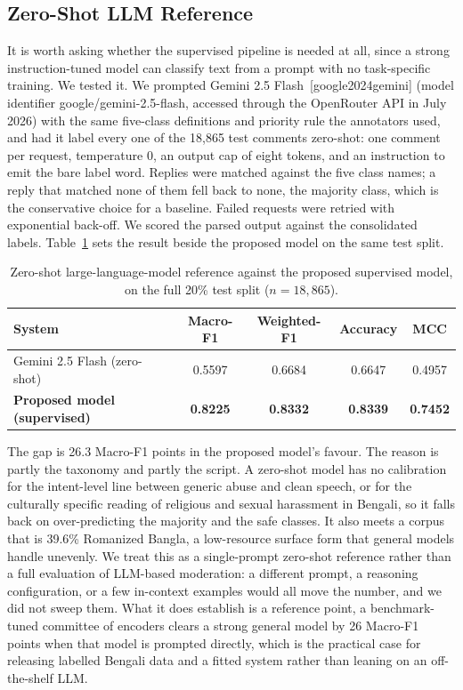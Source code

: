 \documentclass[11pt,a4paper]{article}
\def\citep#1{[#1]}%
\def\texttt#1{#1}%
\def\emph#1{#1}%
\begin{document}
\subsection{Zero-Shot LLM Reference}
\label{sec:llm-baseline}

It is worth asking whether the supervised pipeline is needed at all, since a strong instruction-tuned model can classify text from a prompt with no task-specific training. We tested it. We prompted Gemini 2.5 Flash~\citep{google2024gemini} (model identifier \texttt{google/gemini-2.5-flash}, accessed through the OpenRouter API in July 2026) with the same five-class definitions and priority rule the annotators used, and had it label every one of the 18{,}865 test comments zero-shot: one comment per request, temperature $0$, an output cap of eight tokens, and an instruction to emit the bare label word. Replies were matched against the five class names; a reply that matched none of them fell back to \emph{none}, the majority class, which is the conservative choice for a baseline. Failed requests were retried with exponential back-off. We scored the parsed output against the consolidated labels. Table~\ref{tab:llm} sets the result beside the proposed model on the same test split.

\begin{table}[!htbp]
\centering
\caption{Zero-shot large-language-model reference against the proposed supervised model, on the full 20\% test split ($n = 18{,}865$).}
\label{tab:llm}
\small
\begin{tabular}{@{}lcccc@{}}
\toprule
\textbf{System} & \textbf{Macro-F1} & \textbf{Weighted-F1} & \textbf{Accuracy} & \textbf{MCC} \\
\midrule
Gemini 2.5 Flash (zero-shot) & 0.5597 & 0.6684 & 0.6647 & 0.4957 \\
\textbf{Proposed model (supervised)} & \textbf{0.8225} & \textbf{0.8332} & \textbf{0.8339} & \textbf{0.7452} \\
\bottomrule
\end{tabular}
\end{table}

The gap is 26.3 Macro-F1 points in the proposed model's favour. The reason is partly the taxonomy and partly the script. A zero-shot model has no calibration for the intent-level line between generic abuse and clean speech, or for the culturally specific reading of religious and sexual harassment in Bengali, so it falls back on over-predicting the majority and the safe classes. It also meets a corpus that is 39.6\% Romanized Bangla, a low-resource surface form that general models handle unevenly. We treat this as a single-prompt zero-shot reference rather than a full evaluation of LLM-based moderation: a different prompt, a reasoning configuration, or a few in-context examples would all move the number, and we did not sweep them. What it does establish is a reference point, a benchmark-tuned committee of encoders clears a strong general model by 26 Macro-F1 points when that model is prompted directly, which is the practical case for releasing labelled Bengali data and a fitted system rather than leaning on an off-the-shelf LLM.
\end{document}
